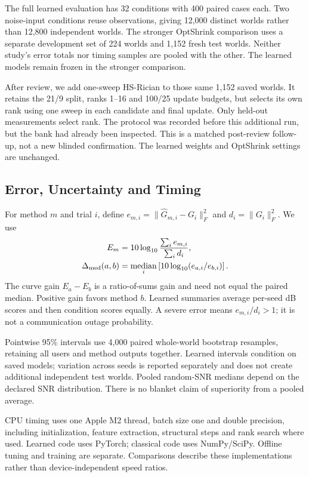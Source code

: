 \documentclass[10pt,journal,letterpaper]{IEEEtran}
\DeclareMathOperator{\median}{median}
\begin{document}
The full learned evaluation has 32 conditions with 400 paired cases each. Two noise-input conditions reuse observations, giving 12,000 distinct worlds rather than 12,800 independent worlds. The stronger OptShrink comparison uses a separate development set of 224 worlds and 1,152 fresh test worlds. Neither study's error totals nor timing samples are pooled with the other. The learned models remain frozen in the stronger comparison.

After review, we add one-sweep HS-Rician to those same 1,152 saved worlds. It retains the 21/9 split, ranks 1--16 and 100/25 update budgets, but selects its own rank using one sweep in each candidate and final update. Only held-out measurements select rank. The protocol was recorded before this additional run, but the bank had already been inspected. This is a matched post-review follow-up, not a new blinded confirmation. The learned weights and OptShrink settings are unchanged.

\subsection{Error, Uncertainty and Timing}
For method $m$ and trial $i$, define $e_{m,i}=\|\widehat G_{m,i}-G_i\|_F^2$ and $d_i=\|G_i\|_F^2$. We use
\begin{align}
 E_m&=10\log_{10}\frac{\sum_i e_{m,i}}{\sum_i d_i},\label{eq:nmse}\\
 \Delta_{\rm med}(a,b)&=\median_i\left[10\log_{10}(e_{a,i}/e_{b,i})\right].
\end{align}
The curve gain $E_a-E_b$ is a ratio-of-sums gain and need not equal the paired median. Positive gain favors method $b$. Learned summaries average per-seed dB scores and then condition scores equally. A severe error means $e_{m,i}/d_i>1$; it is not a communication outage probability.

Pointwise 95\% intervals use 4,000 paired whole-world bootstrap resamples, retaining all users and method outputs together. Learned intervals condition on saved models; variation across seeds is reported separately and does not create additional independent test worlds. Pooled random-SNR medians depend on the declared SNR distribution. There is no blanket claim of superiority from a pooled average.

CPU timing uses one Apple M2 thread, batch size one and double precision, including initialization, feature extraction, structural steps and rank search where used. Learned code uses PyTorch; classical code uses NumPy/SciPy. Offline tuning and training are separate. Comparisons describe these implementations rather than device-independent speed ratios.
\end{document}
